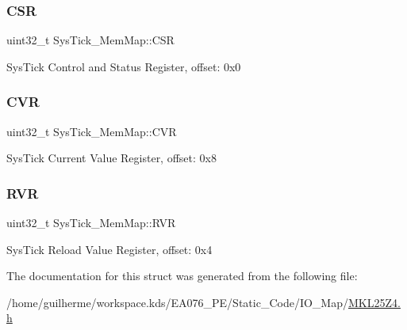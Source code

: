 \subsubsection{\texorpdfstring{C\+SR}{CSR}}
{\footnotesize\ttfamily uint32\+\_\+t Sys\+Tick\+\_\+\+Mem\+Map\+::\+C\+SR}

Sys\+Tick Control and Status Register, offset\+: 0x0 \mbox{\label{struct_sys_tick___mem_map_a508dd628bc347f199e7baf4b1bfbfa0d}} 
\subsubsection{\texorpdfstring{C\+VR}{CVR}}
{\footnotesize\ttfamily uint32\+\_\+t Sys\+Tick\+\_\+\+Mem\+Map\+::\+C\+VR}

Sys\+Tick Current Value Register, offset\+: 0x8 \mbox{\label{struct_sys_tick___mem_map_a3f2018b492fd4bc1d141a718d499e50f}} 
\subsubsection{\texorpdfstring{R\+VR}{RVR}}
{\footnotesize\ttfamily uint32\+\_\+t Sys\+Tick\+\_\+\+Mem\+Map\+::\+R\+VR}

Sys\+Tick Reload Value Register, offset\+: 0x4 

The documentation for this struct was generated from the following file\+:\begin{DoxyCompactItemize}
\item 
/home/guilherme/workspace.\+kds/\+E\+A076\+\_\+\+P\+E/\+Static\+\_\+\+Code/\+I\+O\+\_\+\+Map/\hyperlink{_m_k_l25_z4_8h}{M\+K\+L25\+Z4.\+h}\end{DoxyCompactItemize}
